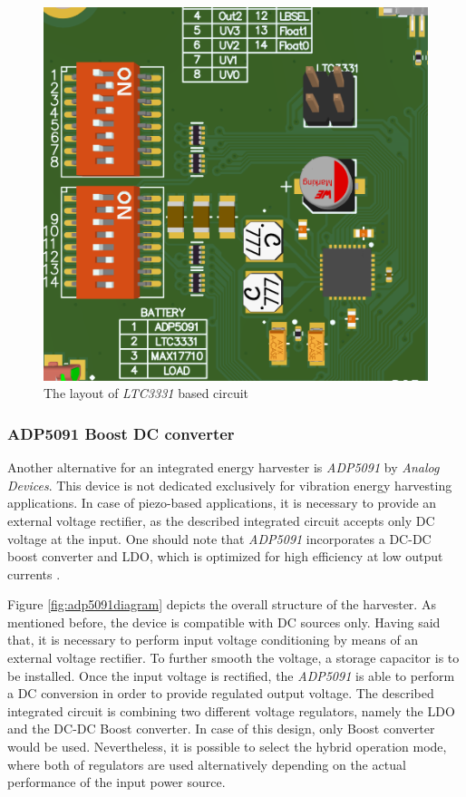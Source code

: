 \documentclass[12pt,a4paper]{article}
\begin{document}
\begin{figure}[ht!]
\includegraphics[scale=0.8]{ltc3331_layout.png}
\caption{The layout of \textit{LTC3331} based circuit}
\label{fig:ltc3331layout}
\end{figure}
\par

\subsubsection{ADP5091 Boost DC converter}

Another alternative for an integrated energy harvester is \textit{ADP5091} by \textit{Analog Devices}. This device is not dedicated exclusively for vibration energy harvesting applications. In case of piezo-based applications, it is necessary to provide an external voltage rectifier, as the described integrated circuit accepts only DC voltage at the input. One should note that \textit{ADP5091} incorporates a DC-DC boost converter and LDO, which is optimized for high efficiency at low output currents \cite{adp5091_params}.
\par

Figure \ref{fig:adp5091diagram} depicts the overall structure of the harvester. As mentioned before, the device is compatible with DC sources only. Having said that, it is necessary to perform input voltage conditioning by means of an external voltage rectifier. To further smooth the voltage, a storage capacitor is to be installed. Once the input voltage is rectified, the \textit{ADP5091} is able to perform a DC conversion in order to provide regulated output voltage. The described integrated circuit is combining two different voltage regulators, namely the LDO and the DC-DC Boost converter. In case of this design, only Boost converter would be used. Nevertheless, it is possible to select the hybrid operation mode, where both of regulators are used alternatively depending on the actual performance of the input power source\cite{adp5091_params}.
\end{document}
